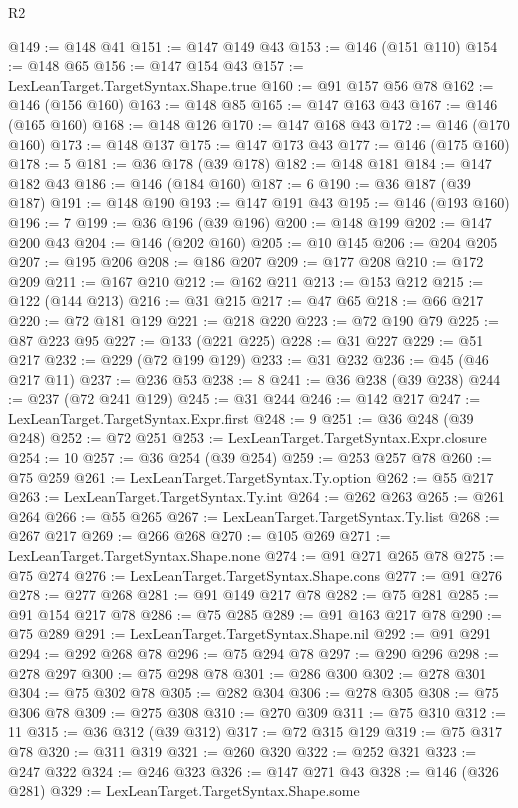 \begin{lexlean}{R2}
\begin{coremodule}
@149 := @148 @41
@151 := @147 @149 @43
@153 := @146 (@151 @110)
@154 := @148 @65
@156 := @147 @154 @43
@157 := LexLeanTarget.TargetSyntax.Shape.true
@160 := @91 @157 @56 @78
@162 := @146 (@156 @160)
@163 := @148 @85
@165 := @147 @163 @43
@167 := @146 (@165 @160)
@168 := @148 @126
@170 := @147 @168 @43
@172 := @146 (@170 @160)
@173 := @148 @137
@175 := @147 @173 @43
@177 := @146 (@175 @160)
@178 := 5
@181 := @36 @178 (@39 @178)
@182 := @148 @181
@184 := @147 @182 @43
@186 := @146 (@184 @160)
@187 := 6
@190 := @36 @187 (@39 @187)
@191 := @148 @190
@193 := @147 @191 @43
@195 := @146 (@193 @160)
@196 := 7
@199 := @36 @196 (@39 @196)
@200 := @148 @199
@202 := @147 @200 @43
@204 := @146 (@202 @160)
@205 := @10 @145
@206 := @204 @205
@207 := @195 @206
@208 := @186 @207
@209 := @177 @208
@210 := @172 @209
@211 := @167 @210
@212 := @162 @211
@213 := @153 @212
@215 := @122 (@144 @213)
@216 := @31 @215
@217 := @47 @65
@218 := @66 @217
@220 := @72 @181 @129
@221 := @218 @220
@223 := @72 @190 @79
@225 := @87 @223 @95
@227 := @133 (@221 @225)
@228 := @31 @227
@229 := @51 @217
@232 := @229 (@72 @199 @129)
@233 := @31 @232
@236 := @45 (@46 @217 @11)
@237 := @236 @53
@238 := 8
@241 := @36 @238 (@39 @238)
@244 := @237 (@72 @241 @129)
@245 := @31 @244
@246 := @142 @217
@247 := LexLeanTarget.TargetSyntax.Expr.first
@248 := 9
@251 := @36 @248 (@39 @248)
@252 := @72 @251
@253 := LexLeanTarget.TargetSyntax.Expr.closure
@254 := 10
@257 := @36 @254 (@39 @254)
@259 := @253 @257 @78
@260 := @75 @259
@261 := LexLeanTarget.TargetSyntax.Ty.option
@262 := @55 @217
@263 := LexLeanTarget.TargetSyntax.Ty.int
@264 := @262 @263
@265 := @261 @264
@266 := @55 @265
@267 := LexLeanTarget.TargetSyntax.Ty.list
@268 := @267 @217
@269 := @266 @268
@270 := @105 @269
@271 := LexLeanTarget.TargetSyntax.Shape.none
@274 := @91 @271 @265 @78
@275 := @75 @274
@276 := LexLeanTarget.TargetSyntax.Shape.cons
@277 := @91 @276
@278 := @277 @268
@281 := @91 @149 @217 @78
@282 := @75 @281
@285 := @91 @154 @217 @78
@286 := @75 @285
@289 := @91 @163 @217 @78
@290 := @75 @289
@291 := LexLeanTarget.TargetSyntax.Shape.nil
@292 := @91 @291
@294 := @292 @268 @78
@296 := @75 @294 @78
@297 := @290 @296
@298 := @278 @297
@300 := @75 @298 @78
@301 := @286 @300
@302 := @278 @301
@304 := @75 @302 @78
@305 := @282 @304
@306 := @278 @305
@308 := @75 @306 @78
@309 := @275 @308
@310 := @270 @309
@311 := @75 @310
@312 := 11
@315 := @36 @312 (@39 @312)
@317 := @72 @315 @129
@319 := @75 @317 @78
@320 := @311 @319
@321 := @260 @320
@322 := @252 @321
@323 := @247 @322
@324 := @246 @323
@326 := @147 @271 @43
@328 := @146 (@326 @281)
@329 := LexLeanTarget.TargetSyntax.Shape.some

\end{coremodule}
\end{lexlean}
